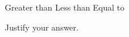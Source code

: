 \documentclass{../../oss-apphys-exam}
\begin{document}
\begin{questions}
\begin{parts}
    \vspace{.1in}
    \underline{\hspace{.3in}} Greater than\hspace{.2in}
    \underline{\hspace{.3in}} Less than\hspace{.2in}
    \underline{\hspace{.3in}} Equal to

    \vspace{.1in}Justify your answer.
    \vspace{\stretch1}
  \end{parts}
  \newpage
  
%
%  

\end{questions}
\end{document}
